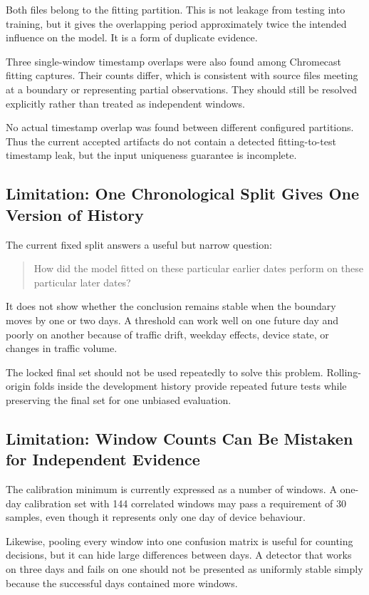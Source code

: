 \documentclass[11pt,a4paper]{article}
\begin{document}
Both files belong to the fitting partition. This is not leakage from testing
into training, but it gives the overlapping period approximately twice the
intended influence on the model. It is a form of duplicate evidence.

Three single-window timestamp overlaps were also found among Chromecast fitting
captures. Their counts differ, which is consistent with source files meeting
at a boundary or representing partial observations. They should still be
resolved explicitly rather than treated as independent windows.

No actual timestamp overlap was found between different configured partitions.
Thus the current accepted artifacts do not contain a detected fitting-to-test
timestamp leak, but the input uniqueness guarantee is incomplete.

\subsection{Limitation: One Chronological Split Gives One Version of History}

The current fixed split answers a useful but narrow question:

\begin{quote}
How did the model fitted on these particular earlier dates perform on these
particular later dates?
\end{quote}

It does not show whether the conclusion remains stable when the boundary moves
by one or two days. A threshold can work well on one future day and poorly on
another because of traffic drift, weekday effects, device state, or changes in
traffic volume.

The locked final set should not be used repeatedly to solve this problem.
Rolling-origin folds inside the development history provide repeated future
tests while preserving the final set for one unbiased evaluation.

\subsection{Limitation: Window Counts Can Be Mistaken for Independent Evidence}

The calibration minimum is currently expressed as a number of windows. A
one-day calibration set with 144 correlated windows may pass a requirement of
30 samples, even though it represents only one day of device behaviour.

Likewise, pooling every window into one confusion matrix is useful for counting
decisions, but it can hide large differences between days. A detector that
works on three days and fails on one should not be presented as uniformly
stable simply because the successful days contained more windows.
\end{document}
